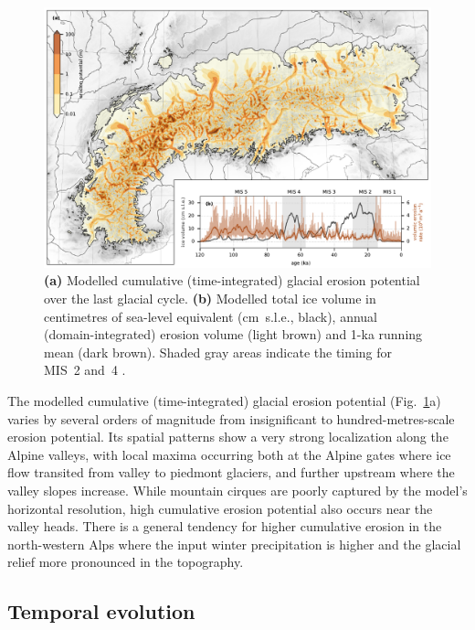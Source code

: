 \documentclass[esurf, manuscript]{copernicus}
\begin{document}
    \begin{figure}[ht]
      \centerline{\includegraphics{alpero_cumulative}}
      \caption{%
        \textbf{(a)} Modelled cumulative (time-integrated) glacial erosion
          potential over the last glacial cycle.
        \textbf{(b)} Modelled total ice volume in centimetres of sea-level
          equivalent (cm~s.l.e., black), annual (domain-integrated) erosion
          volume (light brown) and 1-ka running mean (dark brown). Shaded gray
          areas indicate the timing for MIS~2 and~4
          \citep{Lisiecki.Raymo.2005}.}
        \label{fig:cumulative}
    \end{figure}

    The modelled cumulative (time-integrated) glacial erosion potential
    (Fig.~\ref{fig:cumulative}a) varies by several orders of magnitude
    from insignificant to hundred-metres-scale erosion potential. Its spatial
    patterns show a very strong localization along the Alpine valleys, with
    local maxima occurring both at
    the Alpine gates where ice flow transited from valley to piedmont glaciers,
    and further upstream where the valley slopes increase. While mountain
    cirques are poorly captured by the model's horizontal resolution, high
    cumulative erosion potential also occurs near the valley heads.
    There is a general tendency for higher cumulative erosion in the
    north-western Alps where the input winter precipitation is higher
    \citep[WorldClim, Fig.~1h in][]{Seguinot.etal.2018} and the glacial relief
    more pronounced in the topography.

\subsection{Temporal evolution}
\end{document}
